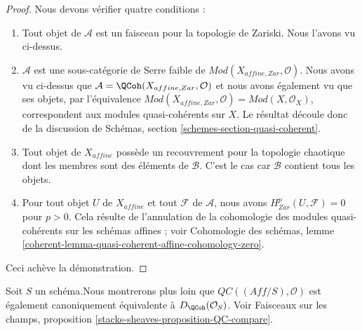 \begin{proof}
\medskip\noindent
Nous devons vérifier quatre conditions :
\begin{enumerate}
\item Tout objet de $\mathcal{A}$ est un faisceau pour la topologie de Zariski.
Nous l'avons vu ci-dessus.
\item $\mathcal{A}$ est une sous-catégorie de Serre faible de
$\textit{Mod}(X_{affine, Zar}, \mathcal{O})$. Nous avons vu
ci-dessus que $\mathcal{A} = \QCoh(X_{affine, Zar}, \mathcal{O})$ et
nous avons également vu que ses objets,
par l'équivalence $\textit{Mod}(X_{affine, Zar}, \mathcal{O}) =
\textit{Mod}(X, \mathcal{O}_X)$, correspondent aux modules quasi-cohérents
sur $X$. Le résultat découle donc de la discussion de
Schémas, section \ref{schemes-section-quasi-coherent}.
\item Tout objet de $X_{affine}$ possède un recouvrement pour la topologie
chaotique dont les membres sont des éléments de $\mathcal{B}$. C'est le cas
car $\mathcal{B}$ contient tous les objets.
\item Pour tout objet $U$ de $X_{affine}$ et tout $\mathcal{F}$ de $\mathcal{A}$,
nous avons $H^p_{Zar}(U, \mathcal{F}) = 0$ pour $p > 0$.
Cela résulte de l'annulation de la cohomologie des modules quasi-cohérents
sur les schémas affines ; voir
Cohomologie des schémas, lemme
\ref{coherent-lemma-quasi-coherent-affine-cohomology-zero}.
\end{enumerate}
Ceci achève la démonstration.
\end{proof}

\begin{remark}
\label{remark-QC-compare}
Soit $S$ un schéma.\newline Nous montrerons plus loin que
$\mathit{QC}((\textit{Aff}/S), \mathcal{O})$
est également canoniquement équivalente à $D_\QCoh(\mathcal{O}_S)$.
Voir Faisceaux sur les champs, proposition \ref{stacks-sheaves-proposition-QC-compare}.
\end{remark}














